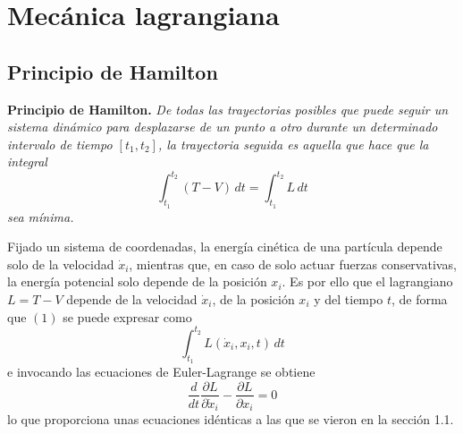 \documentclass[12pt]{report}
\begin{document}
\chapter{Mecánica lagrangiana}

\section{Principio de Hamilton}

\noindent \textbf{Principio de Hamilton.} \textit{De todas las trayectorias posibles que puede seguir un sistema dinámico para desplazarse de un punto a otro durante un determinado intervalo de tiempo $[t_1,t_2]$, la trayectoria seguida es aquella que hace que la integral}
\[\int_{t_1}^{t_2}(T-V) \, dt = \int_{t_1}^{t_2} L \, dt \tag{1}\]
\textit{sea mínima.}

\vspace{2mm}
Fijado un sistema de coordenadas, la energía cinética de una partícula depende solo de la velocidad $\dot{x}_i$, mientras que, en caso de solo actuar fuerzas conservativas, la energía potencial solo depende de la posición $x_i$. Es por ello que el lagrangiano $L = T-V$ depende de la velocidad $\dot{x}_i$, de la posición $x_i$ y del tiempo $t$, de forma que $(1)$ se puede expresar como
\[\int_{t_1}^{t_2} L(\dot{x}_i, x_i, t) \, dt\]
e invocando las ecuaciones de Euler-Lagrange se obtiene
\[\frac{d}{dt}\frac{\partial L}{\partial \dot{x}_i} - \frac{\partial L}{\partial x_i} = 0\]
lo que proporciona unas ecuaciones idénticas a las que se vieron en la sección 1.1.
\end{document}
